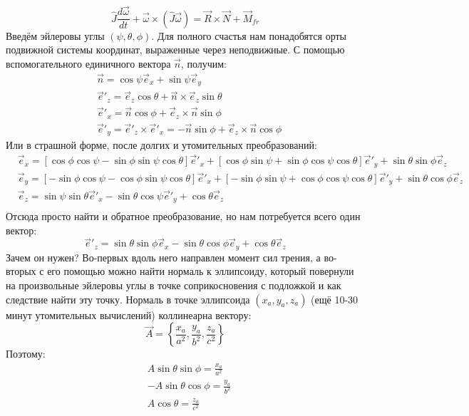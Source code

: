 \[
	\hat{J} \frac{d\vec{\omega}}{dt} + \vec{\omega}\times(\hat{J}\vec{\omega}) = \vec{R}\times\vec{N} + \vec{M}_{fr}
\]
Введём эйлеровы углы $(\psi, \theta, \phi)$. Для полного счастья нам понадобятся орты подвижной системы координат, выраженные через неподвижные. С помощью вспомогательного единичного вектора $\vec{n}$, получим:
\[
	\begin{aligned}
	& \vec{n} = \cos \psi \vec{e}_x + \sin \psi \vec{e}_y \\
	& \vec{e}'_z = \vec{e}_z \cos \theta  + \vec{n}\times\vec{e}_z \sin \theta \\
	& \vec{e}'_x = \vec{n} \cos \phi  + \vec{e}_z\times\vec{n} \sin \phi \\
	& \vec{e}'_y = \vec{e}'_z \times \vec{e}'_x = - \vec{n} \sin \phi + \vec{e}_z\times\vec{n} \cos \phi
	\end{aligned}
\]
Или в страшной форме, после долгих и утомительных преобразований:
\[
	\begin{aligned}
	& \vec{e}_x =
	[\cos \phi \cos \psi - \sin \phi \sin \psi \cos \theta] \vec{e}'_x +
	[\cos \phi \sin \psi + \sin \phi \cos \psi \cos \theta] \vec{e}'_y +
	\sin \theta \sin \phi \vec{e}_z \\
	& \vec{e}_y =
	[- \sin \phi \cos \psi - \cos \phi \sin \psi \cos \theta] \vec{e}'_x +
	[- \sin \phi \sin \psi + \cos \phi \cos \psi \cos \theta] \vec{e}'_y +
	\sin \theta \cos \phi \vec{e}_z \\
	& \vec{e}_z =
	\sin \psi \sin \theta \vec{e}'_x -
	\sin \theta \cos \psi \vec{e}'_y +
	\cos \theta \vec{e}_z \\
	\end{aligned}
\]
Отсюда просто найти и обратное преобразование, но нам потребуется всего один вектор:
\[
	\vec{e}'_z =
	\sin \theta \sin \phi \vec{e}_x -
	\sin \theta \cos \phi \vec{e}_y +
	\cos \theta \vec{e}_z
\]
Зачем он нужен? Во-первых вдоль него направлен момент сил трения, а во-вторых с его помощью можно найти нормаль к эллипсоиду, который повернули на произвольные эйлеровы углы в точке соприкосновения с подложкой и как следствие найти эту точку.
Нормаль в точке эллипсоида $(x_a, y_a, z_a)$ (ещё 10-30 минут утомительных вычислений) коллинеарна вектору:
\[
	\vec{A} = \left\{
		\frac{x_a}{a^2},  \frac{y_a}{b^2}, \frac{z_a}{c^2}
	\right\}
\]
Поэтому:
\[
	\begin{aligned}
	& A\sin \theta \sin \phi  = \frac{x_a}{a^2} \\
	& -A\sin \theta \cos \phi  = \frac{y_a}{b^2} \\
	& A\cos \theta  = \frac{z_a}{c^2} \\
	\end{aligned}
\]
